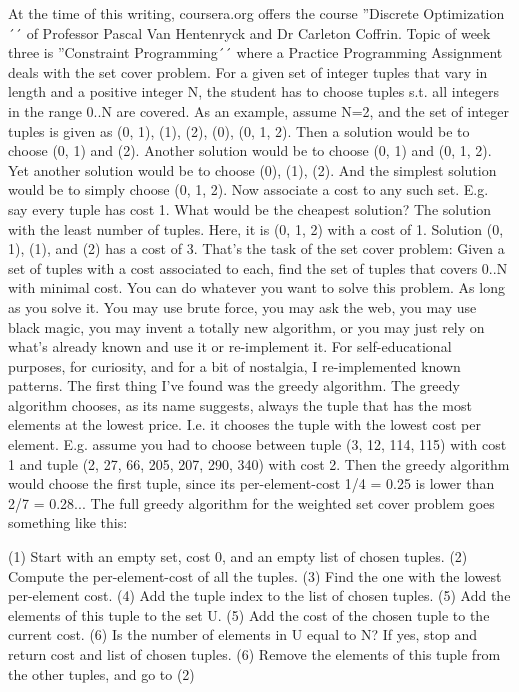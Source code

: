 At the time of this writing, coursera.org offers the course ''Discrete Optimization´´ of Professor Pascal Van Hentenryck and Dr Carleton Coffrin.
Topic of week three is ''Constraint Programming´´ where a Practice Programming Assignment deals with the set cover problem.
For a given set of integer tuples that vary in length and a positive integer N, the student has to choose tuples s.t. all integers in the range 0..N are covered.
As an example, assume N=2, and the set of integer tuples is given as {(0, 1), (1), (2), (0), (0, 1, 2)}.
Then a solution would be to choose (0, 1) and (2).
Another solution would be to choose (0, 1) and (0, 1, 2).
Yet another solution would be to choose (0), (1), (2).
And the simplest solution would be to simply choose (0, 1, 2).
Now associate a cost to any such set.
E.g. say every tuple has cost 1.
What would be the cheapest solution? 
The solution with the least number of tuples.
Here, it is (0, 1, 2) with a cost of 1.
Solution (0, 1), (1), and (2) has a cost of 3.
That's the task of the set cover problem:
Given a set of tuples with a cost associated to each, find the set of tuples that covers 0..N with minimal cost.
You can do whatever you want to solve this problem.
As long as you solve it.
You may use brute force, you may ask the web, you may use black magic, you may invent a totally new algorithm, or you may just rely on what's already known and use it or re-implement it.
For self-educational purposes, for curiosity, and for a bit of nostalgia, I re-implemented known patterns.
The first thing I've found was the greedy algorithm.
The greedy algorithm chooses, as its name suggests, always the tuple that has the most elements at the lowest price.
I.e. it chooses the tuple with the lowest cost per element.
E.g. assume you had to choose between tuple (3, 12, 114, 115) with cost 1 and tuple (2, 27, 66, 205, 207, 290, 340) with cost 2.
Then the greedy algorithm would choose the first tuple, since its per-element-cost 1/4 = 0.25 is lower than 2/7 = 0.28... 
The full greedy algorithm for the weighted set cover problem goes something like this:

(1) Start with an empty set, cost 0, and an empty list of chosen tuples.
(2) Compute the per-element-cost of all the tuples.
(3) Find the one with the lowest per-element cost.
(4) Add the tuple index to the list of chosen tuples.
(5) Add the elements of this tuple to the set U.
(5) Add the cost of the chosen tuple to the current cost.
(6) Is the number of elements in U equal to N? If yes, stop and return cost and list of chosen tuples.
(6) Remove the elements of this tuple from the other tuples, and go to (2)

